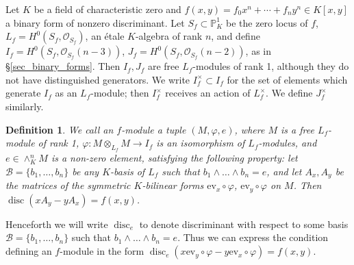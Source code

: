 \documentclass{article} %
\newtheorem{definition}[proposition]{Definition}
\numberwithin{equation}{section}
\newcommand{\bbP}{\mathbb{P}}
\newcommand{\cO}{\mathcal{O}}
\DeclareMathOperator{\disc}{disc}
\begin{document}
Let $K$ be a field of characteristic zero and $f(x,y) = f_0 x^n + \cdots + f_n y^n \in K[x,y]$ a binary form of nonzero discriminant. Let $S_f \subset \bbP^1_K$ be the zero locus of $f$, $L_f = H^0(S_f, \cO_{S_f})$, an \'etale $K$-algebra of rank $n$, and define $I_f = H^0(S_f, \cO_{S_f}(n-3))$, $J_f = H^0(S_f, \cO_{S_f}(n-2))$, as in \S \ref{sec_binary_forms}. Then $I_f, J_f$ are free $L_f$-modules of rank 1, although they do not have distinguished generators. We write $I_f^\times \subset I_f$ for the set of elements which generate $I_f$ as an $L_f$-module; then $I_f^\times$ receives an action of $L_f^\times$. We define $J_f^\times$ similarly. 
\begin{definition}
    We call an $f$-module a tuple $(M, \varphi, e)$, where $M$ is a free $L_f$-module of rank 1, $\varphi : M \otimes_{L_f} M \to I_f$ is an isomorphism of $L_f$-modules, and $e \in \wedge^n_K M$ is a non-zero element, satisfying the following property: let $\mathcal{B} = \{ b_1, \dots, b_n \}$ be any $K$-basis of $L_f$ such that $b_1 \wedge \dots \wedge b_n = e$, and let $A_x, A_y$ be the matrices of the symmetric $K$-bilinear forms $\mathrm{ev}_x \circ \varphi$, $\mathrm{ev}_y \circ \varphi$ on $M$. Then $\disc(x A_y - y A_x) = f(x, y)$. 
\end{definition}
Henceforth we will write $\disc_e$ to denote discriminant with respect to some basis $\mathcal{B} = \{ b_1, \dots, b_n \}$ such that $b_1 \wedge \dots \wedge b_n = e$. Thus we can express the condition defining an $f$-module in the form $\disc_e( x \mathrm{ev}_y \circ \varphi - y \mathrm{ev}_x \circ \varphi) = f(x, y)$.
\end{document}
